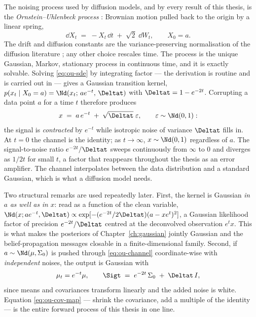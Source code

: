 The noising process used by diffusion models, and by every result of this
thesis, is the \emph{Ornstein--Uhlenbeck process}
\citep{uhlenbeck1930theory}: Brownian motion pulled back to the origin by a
linear spring,
\begin{equation}
  \dd X_t \;=\; -X_t\,\dd t \;+\; \sqrt{2}\;\dd W_t ,
  \qquad X_0 = a .
  \label{eq:ou-sde}
\end{equation}
The drift and diffusion constants are the variance-preserving normalisation of
the diffusion literature \citep{song2021scorebased}; any other choice rescales
time. The process is the unique Gaussian, Markov, stationary process in
continuous time, and it is exactly solvable. Solving \eqref{eq:ou-sde} by
integrating factor --- the derivation is routine and is carried out in
\compendium{} --- gives a Gaussian transition kernel,
$p(x_t \mid X_0 = a) = \Nd(x_t;\, a e^{-t},\, \Deltat)$ with
$\Deltat = 1 - e^{-2t}$. Corrupting a data point $a$ for a time $t$ therefore
produces
\begin{equation}
  x \;=\; a\, e^{-t} \;+\; \sqrt{\Deltat}\;\varepsilon,
  \qquad \varepsilon \sim \Nd(0, 1):
  \label{eq:ou-channel}
\end{equation}
the signal is \emph{contracted} by $e^{-t}$ while isotropic noise of variance
$\Deltat$ fills in. At $t = 0$ the channel is the identity; as $t \to \infty$,
$x \sim \Nd(0,1)$ regardless of $a$. The signal-to-noise ratio
$e^{-2t}/\Deltat$ sweeps continuously from $\infty$ to $0$ and diverges as
$1/2t$ for small $t$, a factor that reappears throughout the thesis as an error
amplifier. The channel interpolates between the data distribution and a
standard Gaussian, which is what a diffusion model needs.

Two structural remarks are used repeatedly later. First, the kernel is Gaussian
\emph{in $a$ as well as in $x$}: read as a function of the clean variable,
$\Nd(x; a e^{-t}, \Deltat) \propto
\exp[-(e^{-2t}/2\Deltat)(a - x e^{t})^2]$, a Gaussian likelihood factor of
precision $e^{-2t}/\Deltat$ centred at the deconvolved observation $e^t x$.
This is what makes the posteriors of Chapter~\ref{ch:gaussian} jointly Gaussian
and the belief-propagation messages closable in a finite-dimensional family.
Second, if $a \sim \Nd(\mu, \Sigma_0)$ is pushed through \eqref{eq:ou-channel}
coordinate-wise with \emph{independent} noises, the output is Gaussian with
\begin{equation}
  \mu_t = e^{-t}\mu,
  \qquad
  \Sigt \;=\; e^{-2t}\, \Sigma_0 \;+\; \Deltat\, I ,
  \label{eq:ou-cov-map}
\end{equation}
since means and covariances transform linearly and the added noise is white.
Equation \eqref{eq:ou-cov-map} --- shrink the covariance, add a multiple of the
identity --- is the entire forward process of this thesis in one line.

